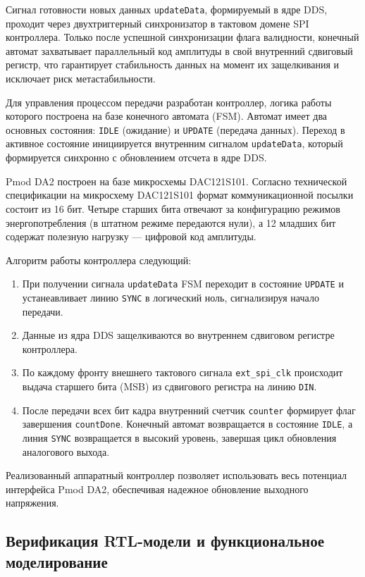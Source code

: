 \documentclass[12pt,a4paper,TimesNewRoman]{article}
\begin{document}
Сигнал готовности новых данных \texttt{updateData}, формируемый в ядре DDS, проходит через двухтриггерный синхронизатор в тактовом домене SPI контроллера. Только после успешной синхронизации флага валидности, конечный автомат захватывает параллельный код амплитуды в свой внутренний сдвиговый регистр, что гарантирует стабильность данных на момент их защелкивания и исключает риск метастабильности.

Для управления процессом передачи разработан контроллер, логика работы которого построена на базе конечного автомата (FSM). Автомат имеет два основных состояния: \texttt{IDLE} (ожидание) и \texttt{UPDATE} (передача данных). Переход в активное состояние инициируется внутренним сигналом \texttt{updateData}, который формируется синхронно с обновлением отсчета в ядре DDS.

Pmod DA2 построен на базе микросхемы DAC121S101. Согласно технической спецификации \cite{dac121s101} на микросхему DAC121S101 формат коммуникационной посылки состоит из 16 бит. Четыре старших бита отвечают за конфигурацию режимов энергопотребления (в штатном режиме передаются нули), а 12 младших бит содержат полезную нагрузку — цифровой код амплитуды.

Алгоритм работы контроллера следующий:
\begin{enumerate}
    \item При получении сигнала \texttt{updateData} FSM переходит в состояние \texttt{UPDATE} и устанеавливает линию \texttt{SYNC} в логический ноль, сигнализируя начало передачи.
    \item Данные из ядра DDS защелкиваются во внутреннем сдвиговом регистре контроллера.
    \item По каждому фронту внешнего тактового сигнала \texttt{ext\_spi\_clk} происходит выдача старшего бита (MSB) из сдвигового регистра на линию \texttt{DIN}.
    \item После передачи всех бит кадра внутренний счетчик \texttt{counter} формирует флаг завершения \texttt{countDone}. Конечный автомат возвращается в состояние \texttt{IDLE}, а линия \texttt{SYNC} возвращается в высокий уровень, завершая цикл обновления аналогового выхода.
\end{enumerate}

Реализованный аппаратный контроллер позволяет использовать весь потенциал интерфейса Pmod DA2, обеспечивая надежное обновление выходного напряжения.

\subsection{Верификация RTL-модели и функциональное моделирование}
\end{document}
